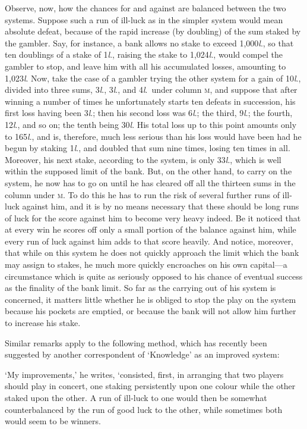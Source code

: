 \documentclass[letterpaper,12pt,oneside,openany]{memoir}
\begin{document}
Observe, now, how the chances for and against are
balanced between the two systems. Suppose such
a run of ill-luck as in the simpler system would
mean absolute defeat, because of the rapid increase (by
doubling) of the sum staked by the gambler. Say, for
instance, a bank allows no stake to exceed 1,000\textit{l}., so
that ten doublings of a stake of 1\textit{l}., raising the stake to
1,024\textit{l}., would compel the gambler to stop, and leave
him with all his accumulated losses, amounting to
1,023\textit{l}. Now, take the case of a gambler trying the
other system for a gain of 10\textit{l}., divided into three sums,
3\textit{l}., 3\textit{l}., and 4\textit{l}.\ under column \textsc{m}, and suppose that after
winning a number of times he unfortunately starts ten
defeats in succession, his first loss having been 3\textit{l}.; then
his second loss was 6\textit{l}.; the third, 9\textit{l}.; the fourth, 12\textit{l}.,
and so on; the tenth being 30\textit{l}. His total loss up to
this point amounts only to 165\textit{l}., and is, therefore, much
less serious than his loss would have been had he begun
by staking 1\textit{l}., and doubled that sum nine times, losing
ten times in all. Moreover, his next stake, according
to the system, is only 33\textit{l}., which is well within the
supposed limit of the bank. But, on the other hand, to
carry on the system, he now has to go on until he has
cleared off all the thirteen sums in the column under \textsc{m}.
To do this he has to run the risk of several further runs
of ill-luck against him, and it is by no means necessary
that these should be long runs of luck for the score
against him to become very heavy indeed. Be it noticed
that at every win he scores off only a small portion of
the balance against him, while every run of luck against
him adds to that score heavily. And notice, moreover,
that while on this system he does not quickly approach
the limit which the bank may assign to stakes, he much
more quickly encroaches on his own capital---a circumstance
which is quite as seriously opposed to his chance
of eventual success as the finality of the bank limit.
So far as the carrying out of his system is concerned, it
matters little whether he is obliged to stop the play on
the system because his pockets are emptied, or because
the bank will not allow him further to increase his
stake.

Similar remarks apply to the following method,
which has recently been suggested by another correspondent
of `Knowledge' as an improved system:

`My improvements,' he writes, `consisted, first, in
arranging that two players should play in concert, one
staking persistently upon one colour while the other
staked upon the other. A run of ill-luck to one would
then be somewhat counterbalanced by the run of good
luck to the other, while sometimes both would seem to
be winners.
\end{document}
